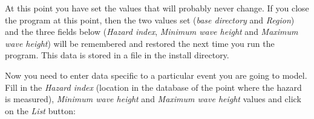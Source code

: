 \documentclass{manual}
\begin{document}
\begin{figure}[ht]
  \centerline{}
  \label{fig:event2}
\end{figure}

At this point you have set the values that will probably never change.  If you close the
program at this point, then the two values set (\emph{base directory} and \emph{Region})
and the three fields below (\emph{Hazard index},
\emph{Minimum wave height} and \emph{Maximum wave height}) will be remembered and restored the 
next time you run the program.  This data is stored in a file 
in the  install directory.

\pagebreak

Now you need to enter data specific to a particular event you are going to model.  Fill
in the \emph{Hazard index} (location in the database of the point where the hazard is measured),
\emph{Minimum wave height} and \emph{Maximum wave height} values
and click on the \emph{List} button:
\end{document}
